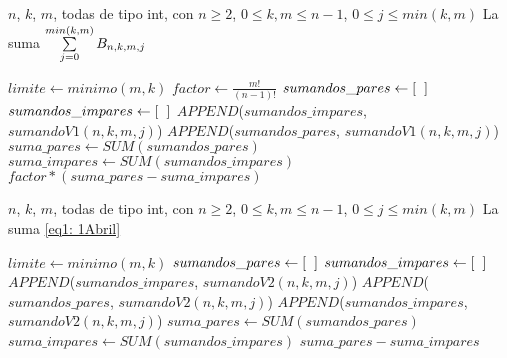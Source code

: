 \begin{algorithm}
\caption{$sumatoriaV1$}\label{alg: sumatoriaV1}
\begin{algorithmic} [1]
\REQUIRE $n$, $k$, $m$, todas de tipo int, con $n \geq 2$, 
$0 \leq k, m \leq n-1$, $0 \leq j \leq min(k,m)$
\ENSURE La suma $\sum\limits_{j=0}^{min(k,m)}B_{n, k, m, j}$

\STATE $limite \leftarrow minimo(m,k)$
\STATE $factor \leftarrow \frac{m!}{(n-1)!}$
\STATE $sumandos\_pares \leftarrow [ \hspace{0.2cm} ]$
\STATE $sumandos\_impares \leftarrow [ \hspace{0.2cm}]$
\STATE $APPEND$($sumandos\_impares$, $sumandoV1(n,k,m,j)$)
\ELSE
\STATE $APPEND$($sumandos\_pares$, $sumandoV1(n,k,m,j)$)
\ENDIF
\ENDFOR
\STATE $suma\_pares \leftarrow SUM(sumandos\_pares)$
\STATE $suma\_impares \leftarrow SUM(sumandos\_impares)$
\RETURN $factor * (suma\_pares - suma\_impares)$
\end{algorithmic}
\end{algorithm}

\begin{algorithm}
\caption{$sumatoriaV2$}\label{alg: sumatoriaV2}
\begin{algorithmic} [1]
\REQUIRE $n$, $k$, $m$, todas de tipo int, con $n \geq 2$, 
$0 \leq k, m \leq n-1$, $0 \leq j \leq min(k,m)$
\ENSURE La suma \eqref{eq1: 1Abril}

\STATE $limite \leftarrow minimo(m,k)$
\STATE $sumandos\_pares \leftarrow [ \hspace{0.2cm} ]$
\STATE $sumandos\_impares \leftarrow [\hspace{0.2cm} ]$
\STATE $APPEND$($sumandos\_impares$, $sumandoV2(n,k,m,j)$)
\ELSE
\STATE $APPEND$($sumandos\_pares$, $sumandoV2(n,k,m,j)$)
\ENDIF
\ENDFOR
{} 
\STATE $APPEND$($sumandos\_impares$, $sumandoV2(n,k,m,j)$)
\ENDFOR
\STATE $suma\_pares \leftarrow SUM(sumandos\_pares)$
\STATE $suma\_impares \leftarrow SUM(sumandos\_impares)$
\RETURN $suma\_pares - suma\_impares$
\end{algorithmic}
\end{algorithm}


